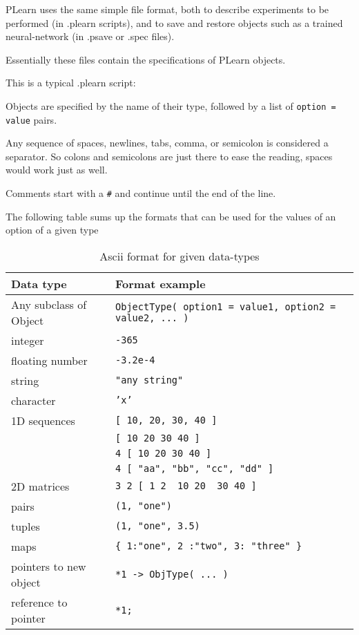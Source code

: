 \documentclass[11pt]{book}
\begin{document}
PLearn uses the same simple file format, both to describe experiments to be
performed (in .plearn scripts), and to save and restore objects
such as a trained neural-network (in .psave or .spec files).

Essentially these files contain the specifications of PLearn objects.

This is a typical .plearn script:



Objects are specified by the name of their type, followed by a list of
\verb!option = value! pairs. 

Any sequence of spaces, newlines, tabs, comma, or semicolon is considered a
separator. So colons and semicolons are just there to ease the reading,
spaces would work just as well.

Comments start with a \verb!#! and continue until the end of the line.

The following table sums up the formats that can be used for the values of
an option of a given type

\begin{table}[h]
\caption{ Ascii format for given data-types }
\label{tab:ascii-format-ex}
\begin{tabular}{|l|l|} \hline 
{\bf Data type}         & {\bf Format example} \\ \hline
Any subclass of Object & {\tt ObjectType( option1 = value1, option2 = value2, ... )} \\ \hline
integer                 & {\tt -365} \\ \hline
floating number         & {\tt -3.2e-4} \\ \hline
string                  & {\tt "any string"} \\ \hline
character               & {\tt 'x'} \\ \hline
1D sequences            & {\tt [ 10, 20, 30, 40 ] } \\ 
                        & {\tt [ 10 20 30 40 ] } \\
                        & {\tt 4 [ 10 20 30 40 ] } \\ 
                        & {\tt 4 [ "aa", "bb", "cc", "dd" ] } \\ \hline
2D matrices             & \verb!3 2 [ 1 2  10 20  30 40 ]!    \\ \hline
pairs                   & {\tt (1, "one")}  \\ \hline
tuples                  & {\tt (1, "one", 3.5)}  \\ \hline
maps                    & \verb!{ 1:"one", 2 :"two", 3: "three" }! \\ \hline
pointers to new object  & \verb!*1 -> ObjType( ... )! \\ \hline
reference to pointer    & \verb!*1;! \\ \hline
\end{tabular}
\begin{center}
\end{center}
\end{table}
\end{document}

